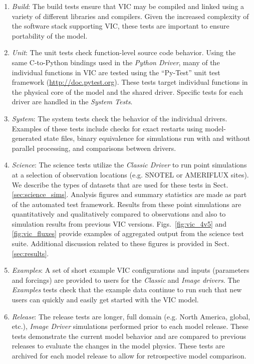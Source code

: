 \documentclass[gmd, manuscript]{copernicus}
\begin{document}
    \begin{enumerate}
      \item \textit{Build}: The build tests ensure that VIC may be compiled and linked using a variety of different libraries and compilers. Given the increased complexity of the software stack supporting VIC, these tests are important to ensure portability of the model.

      \item \textit{Unit}: The unit tests check function-level source code behavior. Using the same C-to-Python bindings used in the \textit{Python Driver}, many of the individual functions in VIC are tested using the ``Py-Test'' unit test framework (\url{http://doc.pytest.org}). These tests target individual functions in the physical core of the model and the shared driver. Specific tests for each driver are handled in the \textit{System Tests}.

      \item \textit{System}: The system tests check the behavior of the individual drivers. Examples of these tests include checks for exact restarts using model-generated state files, binary equivalence for simulations run with and without parallel processing, and comparisons between drivers.

      \item \textit{Science}: The science tests utilize the \textit{Classic Driver} to run point simulations at a selection of observation locations (e.g. SNOTEL or AMERIFLUX sites). We describe the types of datasets that are used for these tests in Sect. \ref{sec:science_sims}. Analysis figures and summary statistics are made as part of the automated test framework. Results from these point simulations are quantitatively and qualitatively compared to observations and also to simulation results from previous VIC versions. Figs.~\ref{fig:vic_4v5} and \ref{fig:vic_fluxes} provide examples of aggregated output from the science test suite. Additional discussion related to these figures is provided in Sect. \ref{sec:results}.

      \item \textit{Examples}: A set of short example VIC configurations and inputs (parameters and forcings) are provided to users for the \textit{Classic} and \textit{Image drivers}. The \textit{Examples} tests check that the example data continue to run such that new users can quickly and easily get started with the VIC model.

      \item \textit{Release}: The release tests are longer, full domain (e.g. North America, global, etc.), \textit{Image Driver} simulations performed prior to each model release. These tests demonstrate the current model behavior and are compared to previous releases to evaluate the changes in the model physics. These tests are archived for each model release to allow for retrospective model comparison.


\end{enumerate}
\end{document}
